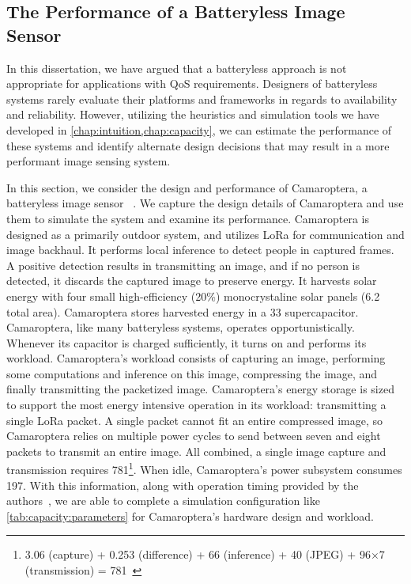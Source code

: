 \subsection{The Performance of a Batteryless Image Sensor}
In this dissertation, we have argued that a batteryless approach is not appropriate for applications with QoS requirements. Designers of batteryless systems rarely evaluate their platforms and frameworks in regards to availability and reliability. However, utilizing the heuristics and simulation tools we have developed in \cref{chap:intuition,chap:capacity}, we can estimate the performance of these systems and identify alternate design decisions that may result in a more performant image sensing system.

In this section, we consider the design and performance of Camaroptera, a batteryless image sensor
~\cite{nardello2019camaroptera,desai2022camaroptera}.
We capture the design details of Camaroptera and use them to simulate the system and examine its performance.
Camaroptera is designed as a primarily outdoor system, and utilizes LoRa for communication and image backhaul.
It performs local inference to detect people in captured frames. A positive detection results in transmitting an image, and if no person is detected, it discards the captured image to preserve energy. 
It harvests solar energy with four small high-efficiency (20\%) monocrystaline solar panels (6.2\ssi{\centi\meter\squared} total area).  Camaroptera stores harvested energy in a 33\ssi{\milli\farad} supercapacitor.
Camaroptera, like many batteryless systems, operates opportunistically. 
Whenever its capacitor is charged sufficiently, it turns on and  performs its workload. 
Camaroptera's workload consists of capturing an image, performing some computations and inference on this image, compressing the image, and finally transmitting the packetized image. 
Camaroptera's energy storage is sized to support the most energy intensive operation in its workload: transmitting a single LoRa packet.
A single packet cannot fit an entire compressed image, so Camaroptera relies on multiple power cycles to send between seven and eight packets to transmit an entire image.
All combined, a single image capture and transmission requires 781\ssi{\milli\joule}\footnote{3.06 (capture) + 0.253 (difference) + 66 (inference) + 40 (JPEG) + 96$\times$7 (transmission) = 781\ssi{\milli\joule}~\cite{desai2022camaroptera}}.
When idle, Camaroptera's power subsystem consumes 197\ssi{\micro\watt}.
With this information, along with operation timing provided by the authors~\cite{desai2022camaroptera}, we are able to complete a simulation configuration like \cref{tab:capacity:parameters} for Camaroptera's hardware design and workload.

